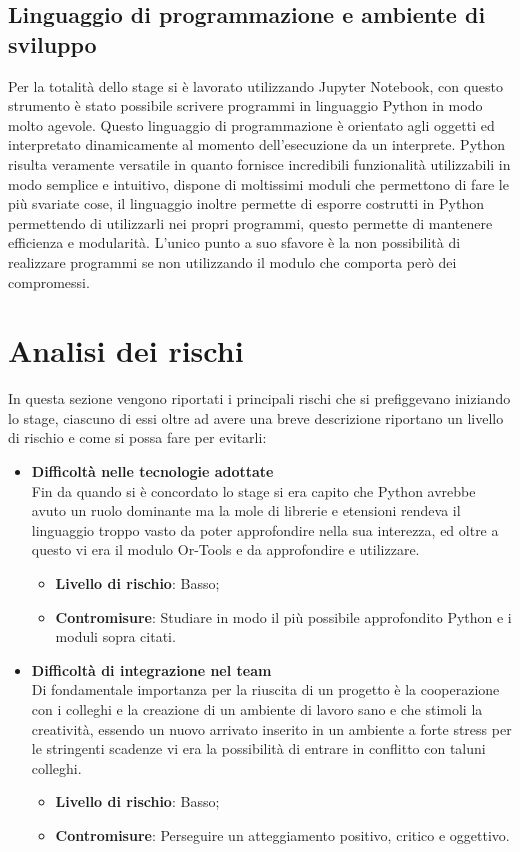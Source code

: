 \subsection{Linguaggio di programmazione e ambiente di sviluppo}
Per la totalità dello stage si è lavorato utilizzando Jupyter Notebook, con questo strumento è stato possibile scrivere programmi in linguaggio Python in modo molto agevole. Questo linguaggio di programmazione è orientato agli oggetti ed interpretato dinamicamente al momento dell’esecuzione da un interprete. Python risulta veramente versatile in quanto fornisce incredibili funzionalità utilizzabili in modo semplice e intuitivo, dispone di moltissimi moduli che permettono di fare le più svariate cose, il linguaggio inoltre permette di esporre costrutti  in Python permettendo di utilizzarli nei propri programmi, questo permette di mantenere efficienza e modularità. L'unico punto a suo sfavore è la non possibilità di realizzare programmi  se non utilizzando il modulo  che comporta però dei compromessi.

\section{Analisi dei rischi}
In questa sezione vengono riportati i principali rischi che si prefiggevano iniziando lo stage, ciascuno di essi oltre ad avere una breve descrizione riportano un livello di rischio e come si possa fare per evitarli:
\begin{itemize}
	\item \textbf{Difficoltà nelle tecnologie adottate}\\
	Fin da quando si è concordato lo stage si era capito che Python avrebbe avuto un ruolo dominante ma la mole di librerie e etensioni rendeva il linguaggio troppo vasto da poter approfondire nella sua interezza, ed oltre a questo vi era il modulo Or-Tools e  da approfondire e utilizzare.
	\begin{itemize}
		\item \textbf{Livello di rischio}: Basso;
		\item \textbf{Contromisure}: Studiare in modo il più possibile approfondito Python e i moduli sopra citati.
	\end{itemize}
	\item \textbf{Difficoltà di integrazione nel team}\\
	Di fondamentale importanza per la riuscita di un progetto è la cooperazione con i colleghi e la creazione di un ambiente di lavoro sano e che stimoli la creatività, essendo un nuovo arrivato inserito in un ambiente a forte stress per le stringenti scadenze vi era la possibilità di entrare in conflitto con taluni colleghi.
	\begin{itemize}
		\item \textbf{Livello di rischio}: Basso;
		\item \textbf{Contromisure}: Perseguire un atteggiamento positivo, critico e oggettivo.
	\end{itemize}
\end{itemize}